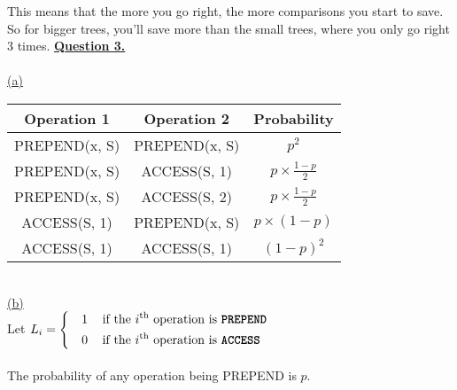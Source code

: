 \documentclass[12pt]{article}
\newcommand{\code}[1]{{\ttfamily \fontseries{b}\selectfont #1}}
\begin{document}
This means that the more you go right, the more comparisons you start to save. So for bigger trees, you'll save more than the small trees, where you only go right 3 times. 
\newpage
\renewcommand{\arraystretch}{1.7}
{{\LARGE \noindent \underline{\textbf{Question 3.}}}}
\\\\
\noindent \hyperlink{toc}{\hypertarget{3.1}{(a)}}
\begin{center}\begin{tabular}{|c|c|c|}
		\hline \cellcolor{gray!25}Operation 1 & \cellcolor{gray!25}Operation 2 & \cellcolor{gray!25}Probability\\
		\hline\hline
		\code{PREPEND(x, S)}  & \code{PREPEND(x, S)} & $p^2$              \\\hline
		\code{PREPEND(x, S)}  & \code{ACCESS(S, 1)}  & $p \times \frac{1-p}{2}$  \\[2mm]\hline
		\code{PREPEND(x, S)}  & \code{ACCESS(S, 2)}  &  $p \times \frac{1-p}{2}$ \\[2mm]\hline
		\code{ACCESS(S, 1)}   & \code{PREPEND(x, S)} & $p \times (1-p)$          \\\hline
		\code{ACCESS(S, 1)}   & \code{ACCESS(S, 1)}  & $(1-p)^2$        \\\hline
\end{tabular}\end{center} \renewcommand{\arraystretch}{1}\ \\[5cm]
\noindent \hyperlink{toc}{\hypertarget{3.2}{(b)}}\\
Let $L_i = \left\{\begin{aligned}
	\ \ \ 1 & \hspace*{3mm}\text{ if the $i$\textsuperscript{th} operation is \code{PREPEND}}\\
	\ \ \ 0 & \hspace*{3mm}\text{ if the $i$\textsuperscript{th} operation is \code{ACCESS}} \\
\end{aligned}\right.$
\\\\
The probability of any operation being \code{PREPEND} is $p$.\\
\end{document}
